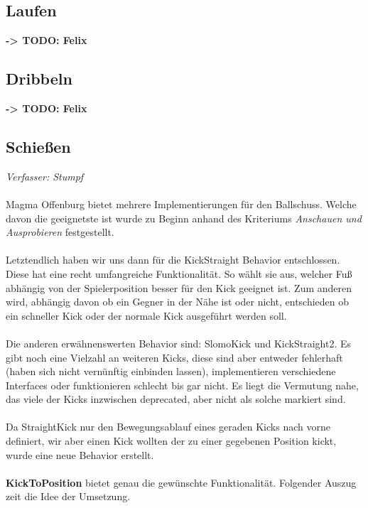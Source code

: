 \documentclass[fontsize=12pt,a4paper,final]{scrartcl}[2003/01/01]
\begin{document}
\subsection{Laufen}\label{sse:Elem Bew:Laufen}
\textbf{-> TODO: Felix}
\subsection{Dribbeln}\label{sse:Elem Bew:Dribbeln}
\textbf{-> TODO: Felix}
\subsection{Schie{\ss}en}\label{sse:Elem Bew:Schiessen}
\textit{Verfasser: Stumpf}\\
\\
Magma Offenburg bietet mehrere Implementierungen für den Ballschuss. Welche davon die geeignetste ist wurde zu Beginn anhand des Kriteriums \textit{\glqq Anschauen und Ausprobieren\grqq} festgestellt.\\
\\
Letztendlich haben wir uns dann für die KickStraight Behavior entschlossen. Diese hat eine recht umfangreiche Funktionalität. So wählt sie aus, welcher Fuß abhängig von der Spielerposition besser für den Kick geeignet ist. Zum anderen wird, abhängig davon ob ein Gegner in der Nähe ist oder nicht, entschieden ob ein schneller Kick oder der normale Kick ausgeführt werden soll.\\
\\
Die anderen erwähnenswerten Behavior sind: SlomoKick und KickStraight2. Es gibt noch eine Vielzahl an weiteren Kicks, diese sind aber entweder fehlerhaft (haben sich nicht vernünftig einbinden lassen), implementieren verschiedene Interfaces oder funktionieren schlecht bis gar nicht. Es liegt die Vermutung nahe, das viele der Kicks inzwischen deprecated, aber nicht als solche markiert sind.\\
\\
Da StraightKick nur den Bewegungsablauf eines geraden Kicks nach vorne definiert, wir aber einen Kick wollten der zu einer gegebenen Position kickt, wurde eine neue Behavior erstellt.\\
\\
\textbf{KickToPosition} bietet genau die gewünschte Funktionalität. Folgender Auszug zeit die Idee der Umsetzung.
\end{document}
